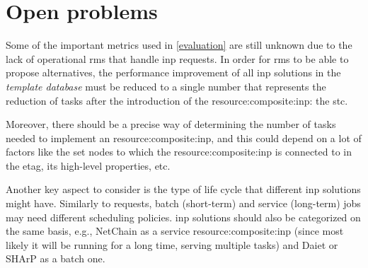 \section{Open problems}
Some of the important metrics used in \autoref{evaluation} are still unknown due to the lack of operational \glspl{rm} that handle \gls{inp} requests.
In order for \glspl{rm} to be able to propose alternatives, the performance improvement of all \gls{inp} solutions in the \textit{template database} must be reduced to a single number that represents the reduction of  tasks after the introduction of the \gls{resource:composite:inp}: the \gls{stc}.

Moreover, there should be a precise way of determining the number of  tasks needed to implement an \gls{resource:composite:inp}, and this could depend on a lot of factors like the set nodes to which the \gls{resource:composite:inp} is connected to in the \gls{etag}, its high-level properties, etc.

Another key aspect to consider is the type of life cycle that different \gls{inp} solutions might have.
Similarly to  requests, batch (short-term) and service (long-term) jobs may need different scheduling policies.
\gls{inp} solutions should also be categorized on the same basis, e.g., NetChain \cite{netchain} as a service \gls{resource:composite:inp} (since most likely it will be running for a long time, serving multiple  tasks) and Daiet \cite{daiet} or SHArP \cite{sharp} as a batch one.